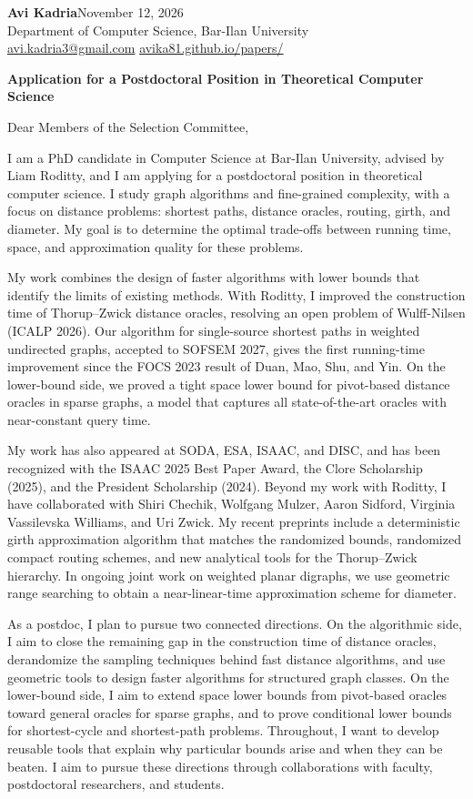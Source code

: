 \documentclass[11pt,a4paper]{article}
\begin{document}
{\Large\bfseries\color{accent}Avi Kadria}\hfill November 12, 2026\\[0.2em]
Department of Computer Science, Bar-Ilan University\\
{\small\color{subtle}\href{mailto:avi.kadria3@gmail.com}{avi.kadria3@gmail.com}
\quad\textbar\quad\href{https://avika81.github.io/papers/}{avika81.github.io/papers/}}

\vspace{0.6em}
\textbf{Application for a Postdoctoral Position in Theoretical Computer Science}

Dear Members of the Selection Committee,

I am a PhD candidate in Computer Science at Bar-Ilan University, advised by Liam Roditty, and I am applying for a postdoctoral position in theoretical computer science. I study graph algorithms and fine-grained complexity, with a focus on distance problems: shortest paths, distance oracles, routing, girth, and diameter. My goal is to determine the optimal trade-offs between running time, space, and approximation quality for these problems.

My work combines the design of faster algorithms with lower bounds that identify the limits of existing methods. With Roditty, I improved the construction time of Thorup--Zwick distance oracles, resolving an open problem of Wulff-Nilsen (ICALP 2026). Our algorithm for single-source shortest paths in weighted undirected graphs, accepted to SOFSEM 2027, gives the first running-time improvement since the FOCS 2023 result of Duan, Mao, Shu, and Yin. On the lower-bound side, we proved a tight space lower bound for pivot-based distance oracles in sparse graphs, a model that captures all state-of-the-art oracles with near-constant query time.

My work has also appeared at SODA, ESA, ISAAC, and DISC, and has been recognized with the ISAAC 2025 Best Paper Award, the Clore Scholarship (2025), and the President Scholarship (2024). Beyond my work with Roditty, I have collaborated with Shiri Chechik, Wolfgang Mulzer, Aaron Sidford, Virginia Vassilevska Williams, and Uri Zwick. My recent preprints include a deterministic girth approximation algorithm that matches the randomized bounds, randomized compact routing schemes, and new analytical tools for the Thorup--Zwick hierarchy. In ongoing joint work on weighted planar digraphs, we use geometric range searching to obtain a near-linear-time approximation scheme for diameter.

As a postdoc, I plan to pursue two connected directions. On the algorithmic side, I aim to close the remaining gap in the construction time of distance oracles, derandomize the sampling techniques behind fast distance algorithms, and use geometric tools to design faster algorithms for structured graph classes. On the lower-bound side, I aim to extend space lower bounds from pivot-based oracles toward general oracles for sparse graphs, and to prove conditional lower bounds for shortest-cycle and shortest-path problems. Throughout, I want to develop reusable tools that explain why particular bounds arise and when they can be beaten. I aim to pursue these directions through collaborations with faculty, postdoctoral researchers, and students.
\end{document}
